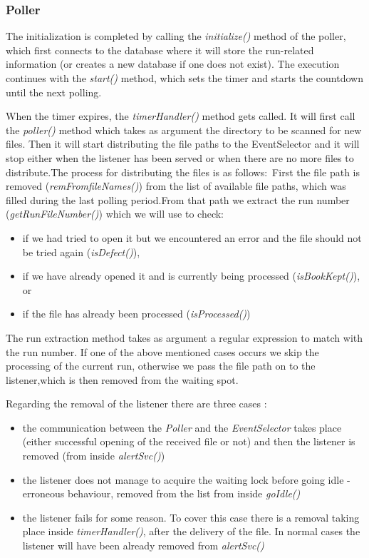\subsubsection{\textbf{Poller}}
The initialization is completed by calling the \textit{initialize()} method of the poller, which first connects to the database where it will store the run-related information (or creates a new database if one does not exist). The execution continues with the \textit{start()} method, which sets the timer and starts the countdown until the next polling.\par
When the timer expires, the \textit{timerHandler()} method gets called. It will first call the \textit{poller()} method which takes as argument the directory to be scanned for new files. Then it will start distributing the file paths to the EventSelector and it will stop either when the listener has been served or when there are no more files to distribute.The process for distributing the files is as follows:~First the file path is removed (\textit{remFromfileNames()}) from the list of available file paths, which was filled during the last polling period.From that path we extract the run number (\textit{getRunFileNumber()}) which we will use to check:\par
\begin{itemize}
\item if we had tried to open it but we encountered an error and the file should not be tried again (\textit{isDefect()}),\par
\item if we have already opened it and is currently being processed (\textit{isBookKept()}), or\par
\item if the file has already been processed (\textit{isProcessed()})\par
\end{itemize}
 The run extraction method takes as argument a regular expression to match with the run number. If one of the above mentioned cases occurs we skip the processing of the current run, otherwise we pass the file path on to the listener,which is then removed from the waiting spot.\par
Regarding the removal of the listener there are three cases :
\begin{itemize}
\item the communication between the \textit{Poller} and the \textit{EventSelector} takes place (either successful opening of the received file or not) and then the listener is removed (from inside \textit{alertSvc()})\par
\item the listener does not manage to acquire the waiting lock before going idle -erroneous behaviour, removed from the list from inside \textit{goIdle()}\par
\item the listener fails for some reason. To cover this case there is a removal taking place inside \textit{timerHandler()}, after the delivery of the file. In normal cases the listener will have been already removed from \textit{alertSvc()}\par
\end{itemize}
